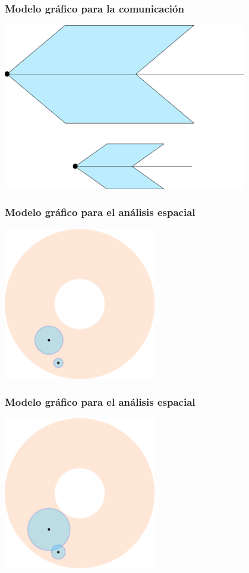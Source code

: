 \documentclass[handout]{beamer}
\theoremstyle{plain}
\theoremstyle{definition}
\theoremstyle{remark}
\begin{document}
\begin{frame}\frametitle{Modelo gráfico para la comunicación}
\centering
\includegraphics[width=0.8\textwidth]{g5579.png}
\end{frame}%

\begin{frame}\frametitle{Modelo gráfico para el análisis espacial}
\centering
\includegraphics[width=0.5\textwidth]{path5812.png}
\end{frame}%

\begin{frame}\frametitle{Modelo gráfico para el análisis espacial}
\centering
\includegraphics[width=0.5\textwidth]{path5813.png}
\end{frame}%
\end{document}
